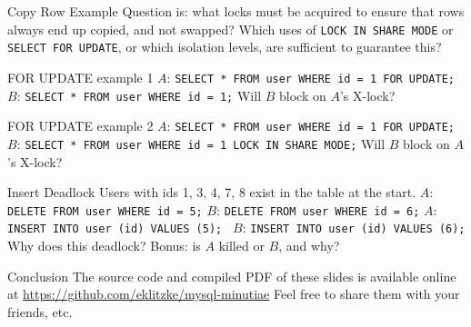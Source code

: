 \documentclass[14pt]{beamer}
\begin{document}
\begin{frame}{Copy Row Example}
  Question is: what locks must be acquired to ensure that rows always end up
  copied, and not swapped?
  \newline
  \newline
  Which uses of \texttt{LOCK IN SHARE MODE} or
  \texttt{SELECT FOR UPDATE}, or which isolation levels, are sufficient to
  guarantee this?
\end{frame}

\begin{frame}{FOR UPDATE example 1}
  $A$: \texttt{SELECT * FROM user WHERE id = 1 FOR UPDATE;}
  \newline
  \newline
  $B$: \texttt{SELECT * FROM user WHERE id = 1;}
  \newline
  \newline
  Will $B$ block on $A$'s X-lock?
\end{frame}

\begin{frame}{FOR UPDATE example 2}
  $A$: \texttt{SELECT * FROM user WHERE id = 1 FOR UPDATE;}
  \newline
  \newline
  $B$: \texttt{SELECT * FROM user WHERE id = 1 LOCK IN SHARE MODE;}
  \newline
  \newline
  Will $B$ block on $A$'s X-lock?
\end{frame}

\begin{frame}{Insert Deadlock}
  Users with ids 1, 3, 4, 7, 8 exist in the table at the start.
  \newline
  \newline
  $A$: \texttt{DELETE FROM user WHERE id = 5;}
  \newline
  $B$: \texttt{DELETE FROM user WHERE id = 6;}
  \newline
  $A$: \texttt{INSERT INTO user (id) VALUES (5); }
  \newline
  $B$: \texttt{INSERT INTO user (id) VALUES (6); }
  \newline
  \newline
  Why does this deadlock?
  \newline
  Bonus: is $A$ killed or $B$, and why?
\end{frame}
\begin{frame}{Conclusion}
  The source code and compiled PDF of these slides is available online at
  \newline
  \url{https://github.com/eklitzke/mysql-minutiae}
  \newline
  \newline
  Feel free to share them with your friends, etc.
\end{frame}
\end{document}
